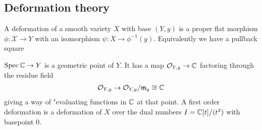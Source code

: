 \documentclass[12pt]{article}
\begin{document}
\subsection{Deformation theory}
A deformation of a smooth variety $X$ with base $(Y,y)$ is a proper flat morphism $\phi: \mathcal{X} \to Y$ with an isomorphism $\psi: X \to \phi^{-1}(y)$. Equivalently we have a pullback square 
\begin{center}
\end{center}
$\operatorname{Spec} \mathbb{C} \to Y$ is a geometric point of $Y$. It has a map ${\mathcal{O}}_{Y,y} \to \mathbb{C}$ factoring through the residue field \begin{align*}
    {\mathcal{O}}_{Y,y} \to {\mathcal{O}}_{Y,y}/\mathfrak{m}_y \cong \mathbb{C}
\end{align*} giving a way of "evaluating functions in $\mathbb{C}$ at that point. A first order deformation is a deformation of $X$ over the dual numbers $I = \mathbb{C}[t]/(t^2)$ with basepoint $0$. 
\end{document}
